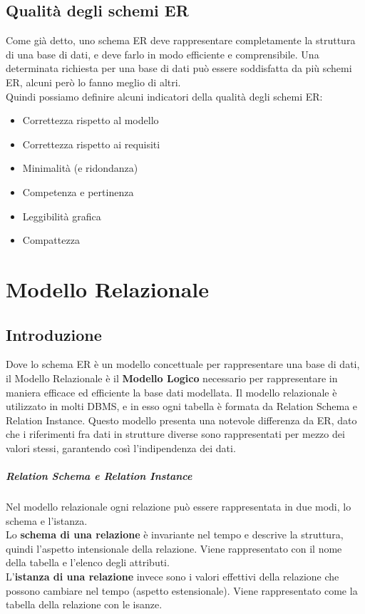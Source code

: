 \documentclass[12pt, a4paper, openany]{book}
\begin{document}
\section{Qualità degli schemi ER}
Come già detto, uno schema ER deve rappresentare completamente la struttura di una base di dati, e deve farlo in modo efficiente e comprensibile. Una determinata richiesta per una base di dati può essere soddisfatta da più schemi ER, alcuni però lo fanno meglio di altri.
\\Quindi possiamo definire alcuni indicatori della qualità degli schemi ER:
\begin{itemize}
    \item Correttezza rispetto al modello
    \item Correttezza rispetto ai requisiti
    \item Minimalità (e ridondanza)
    \item Competenza e pertinenza
    \item Leggibilità grafica
    \item Compattezza
\end{itemize}
\chapter{Modello Relazionale}

\section{Introduzione}
Dove lo schema ER è un modello concettuale per rappresentare una base di dati, il Modello Relazionale è il \textbf{Modello Logico} necessario per rappresentare in maniera efficace ed efficiente la base dati modellata.
Il modello relazionale è utilizzato in molti DBMS, e in esso ogni tabella è formata da Relation Schema e Relation Instance.
Questo modello presenta una notevole differenza da ER, dato che i riferimenti fra dati in strutture diverse sono rappresentati per mezzo dei valori stessi, garantendo così l'indipendenza dei dati.

\paragraph{Relation Schema e Relation Instance}
Nel modello relazionale ogni relazione può essere rappresentata in due modi, lo schema e l'istanza.
\\Lo \textbf{schema di una relazione} è invariante nel tempo e descrive la struttura, quindi l'aspetto intensionale della relazione. Viene rappresentato con il nome della tabella e l'elenco degli attributi.
\\L'\textbf{istanza di una relazione} invece sono i valori effettivi della relazione che possono cambiare nel tempo (aspetto estensionale). Viene rappresentato come la tabella della relazione con le isanze.
\end{document}
